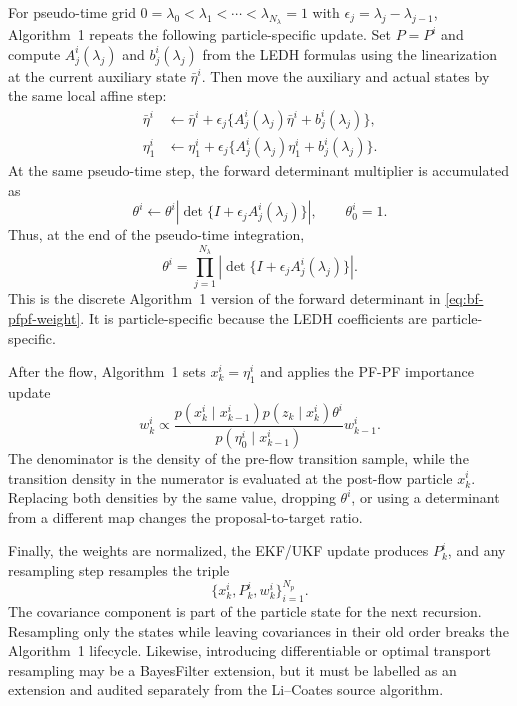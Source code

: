 For pseudo-time grid
$0=\lambda_0<\lambda_1<\cdots<\lambda_{N_\lambda}=1$ with
$\epsilon_j=\lambda_j-\lambda_{j-1}$, Algorithm~1 repeats the following
particle-specific update.  Set $P=P^i$ and compute
$A_j^i(\lambda_j)$ and $b_j^i(\lambda_j)$ from the LEDH formulas using the
linearization at the current auxiliary state $\bar\eta^i$.  Then move the
auxiliary and actual states by the same local affine step:
\begin{align}
\label{eq:bf-pfpf-alg1-auxiliary-step}
  \bar\eta^i
  &\leftarrow
  \bar\eta^i
  +\epsilon_j\{A_j^i(\lambda_j)\bar\eta^i+b_j^i(\lambda_j)\},\\
\label{eq:bf-pfpf-alg1-actual-step}
  \eta_1^i
  &\leftarrow
  \eta_1^i
  +\epsilon_j\{A_j^i(\lambda_j)\eta_1^i+b_j^i(\lambda_j)\}.
\end{align}
At the same pseudo-time step, the forward determinant multiplier is accumulated
as
\begin{equation}
\label{eq:bf-pfpf-alg1-theta-product}
  \theta^i
  \leftarrow
  \theta^i
  \left|\det\{I+\epsilon_j A_j^i(\lambda_j)\}\right|,
  \qquad
  \theta^i_0=1.
\end{equation}
Thus, at the end of the pseudo-time integration,
\begin{equation}
\label{eq:bf-pfpf-alg1-det-product}
  \theta^i
  =
  \prod_{j=1}^{N_\lambda}
  \left|\det\{I+\epsilon_j A_j^i(\lambda_j)\}\right|.
\end{equation}
This is the discrete Algorithm~1 version of the forward determinant in
\eqref{eq:bf-pfpf-weight}.  It is particle-specific because the LEDH
coefficients are particle-specific.

After the flow, Algorithm~1 sets $x_k^i=\eta_1^i$ and applies the PF-PF
importance update
\begin{equation}
\label{eq:bf-pfpf-alg1-weight}
  w_k^i
  \propto
  \frac{
    p(x_k^i\mid x_{k-1}^i)
    p(z_k\mid x_k^i)
    \theta^i
  }{
    p(\eta_0^i\mid x_{k-1}^i)
  }
  w_{k-1}^i .
\end{equation}
The denominator is the density of the pre-flow transition sample, while the
transition density in the numerator is evaluated at the post-flow particle
$x_k^i$.  Replacing both densities by the same value, dropping $\theta^i$, or
using a determinant from a different map changes the proposal-to-target ratio.

Finally, the weights are normalized, the EKF/UKF update produces
$P_k^i$, and any resampling step resamples the triple
\begin{equation}
\label{eq:bf-pfpf-alg1-resampling-triple}
  \{x_k^i,P_k^i,w_k^i\}_{i=1}^{N_p}.
\end{equation}
The covariance component is part of the particle state for the next recursion.
Resampling only the states while leaving covariances in their old order breaks
the Algorithm~1 lifecycle.  Likewise, introducing differentiable or optimal
transport resampling may be a BayesFilter extension, but it must be labelled as
an extension and audited separately from the Li--Coates source algorithm.

